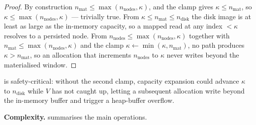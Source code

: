 \documentclass[journal]{IEEEtran}
\begin{document}
\begin{proof}
By construction $n_\text{mat}\le\max(n_\text{nodes},\kappa)$, and the
clamp gives $\kappa\le n_\text{mat}$, so $\kappa\le\max(n_\text{nodes},
\kappa)$ — trivially true. From $\kappa\le n_\text{mat}\le n_\text{disk}$
the disk image is at least as large as the in-memory capacity, so a
mapped read at any index $<\kappa$ resolves to a persisted node. From
$n_\text{nodes}\le\max(n_\text{nodes},\kappa)$ together with
$n_\text{mat}\le\max(n_\text{nodes},\kappa)$ and the clamp
$\kappa\leftarrow\min(\kappa,n_\text{mat})$, no path produces
$\kappa>n_\text{mat}$, so an allocation that increments $n_\text{nodes}$
to $\kappa$ never writes beyond the materialised window.
\end{proof}

 is safety-critical: without the second clamp,
capacity expansion could advance $\kappa$ to $n_\text{disk}$ while $V$
has not caught up, letting a subsequent allocation write beyond the
in-memory buffer and trigger a heap-buffer overflow.

\textbf{Complexity.}
 summarises the main operations.

\begin{table}[ht]
\centering
\caption{LECT operation complexity ($D$ dims, $N$ nodes,
$L_\text{act}$ active links, $K$ average mmap hit bricks)}
\label{tab:lect_complexity}
\end{table}
\end{document}
